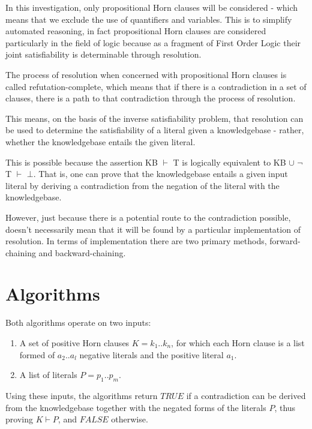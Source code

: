 \documentclass{article}
\begin{document}
In this investigation, only propositional Horn clauses will be considered -
which means that we exclude the use of quantifiers and variables. This is to
simplify automated reasoning, in fact propositional Horn clauses are considered
particularly in the field of logic because as a fragment of First Order Logic 
their joint satisfiability is determinable through resolution.

The process of resolution when concerned with propositional Horn clauses is
called refutation-complete\cite{refcomp}, which means that if there is a
contradiction in a set of clauses, there is a path to that contradiction through
the process of resolution.\cite{resolution}

This means, on the basis of the inverse satisfiability problem\cite{invsat},
that resolution can be used to determine the satisfiability of a
literal given a knowledgebase - rather, whether the knowledgebase entails the
given literal.

This is possible because the assertion KB $\vdash$ T is logically equivalent to
KB $\cup$ $\neg$T $\vdash$ $\bot$. That is, one can prove that the knowledgebase
entails a given input literal by deriving a contradiction from the negation of
the literal with the knowledgebase.

However, just because there is a potential route to the contradiction possible,
doesn't necessarily mean that it will be found by a particular implementation of
resolution. In terms of implementation there are two primary methods, 
forward-chaining and backward-chaining.

\section{Algorithms}

Both algorithms operate on two inputs:

\begin{enumerate}
  \item A set of positive Horn clauses $K = k_1 .. k_n$, for which each Horn
  clause is a list formed of $a_2 .. a_l$ negative literals and the positive 
  literal $a_1$. 
  \item A list of literals $P = p_1 .. p_m$.
\end{enumerate}

Using these inputs, the algorithms return $TRUE$ if a contradiction can be derived
from the knowledgebase together with the negated forms of the literals $P$, thus proving
$K \vdash P$, and $FALSE$ otherwise.
\end{document}
